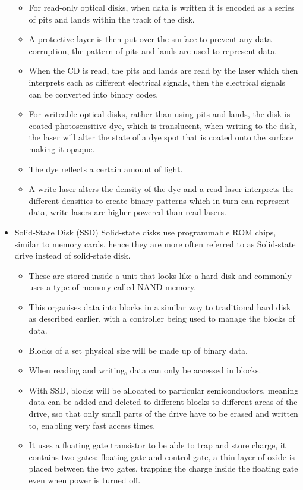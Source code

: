 \begin{itemize}
      \begin{itemize}
        \item For read-only optical disks, when data is written it is encoded as a series of pits and lands within the track of the disk.
        \item A protective layer is then put over the surface to prevent any data corruption, the pattern of pits and lands are used to represent data.
        \item When the CD is read, the pits and lands are read by the laser which then interprets each as different electrical signals, then the electrical signals can be converted into binary codes.
          \subitem
        \item For writeable optical disks, rather than using pits and lands, the disk is coated photosensitive dye, which is translucent, when writing to the disk, the laser will alter the state of a dye spot that is coated onto the surface making it opaque.
        \item The dye reflects a certain amount of light.
        \item A write laser alters the density of the dye and a read laser interprets the different densities to create binary patterns which in turn can represent data, write lasers are higher powered than read lasers.
      \end{itemize}
    \item Solid-State Disk (SSD)
      \subitem Solid-state disks use programmable ROM chips, similar to memory cards, hence they are more often referred to as Solid-state drive instead of solid-state disk.
      \begin{itemize}
        \item These are stored inside a unit that looks like a hard disk and commonly uses a type of memory called NAND memory.
        \item This organises data into blocks in a similar way to traditional hard disk as described earlier, with a controller being used to manage the blocks of data.
        \item Blocks of a set physical size will be made up of binary data.
        \item When reading and writing, data can only be accessed in blocks.
        \item With SSD, blocks will be allocated to particular semiconductors, meaning data can be added and deleted to different blocks to different areas of the drive, sso that only small parts of the drive have to be erased and written to, enabling very fast access times.
        \item It uses a floating gate transistor to be able to trap and store charge, it contains two gates: floating gate and control gate, a thin layer of oxide is placed between the two gates, trapping the charge inside the floating gate even when power is turned off.
      \end{itemize}
  \end{itemize}
